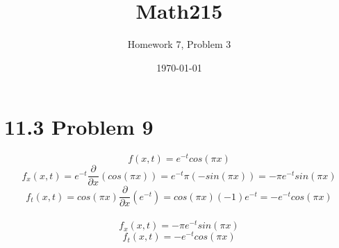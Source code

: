 \documentclass{article} %
\title{Math215} %
\author{Homework 7, Problem 3} %
\date{\today}
\begin{document}
\maketitle %
\section*{11.3 Problem 9} %
\begin{equation*}
  f(x,t) = e^{-t}cos(\pi x)
\end{equation*}
\begin{displaymath}
  f_{x}(x,t) = e^{-t}\frac{\partial}{\partial x}(cos(\pi x)) = e^{-t} \pi (-sin(\pi x)) = -\pi e^{-t}sin(\pi x)
\end{displaymath}
\begin{displaymath}
  f_t(x,t) = cos(\pi x) \frac{\partial}{\partial x}(e^{-t}) = cos(\pi x)(-1)e^{-t} = -e^{-t}cos(\pi x)
\end{displaymath}
\\
\begin{equation}
  f_{x}(x,t) = -\pi e^{-t}sin(\pi x)
\end{equation}
\begin{equation}
  f_t(x,t) = -e^{-t}cos(\pi x)
\end{equation}
  
\end{document}

